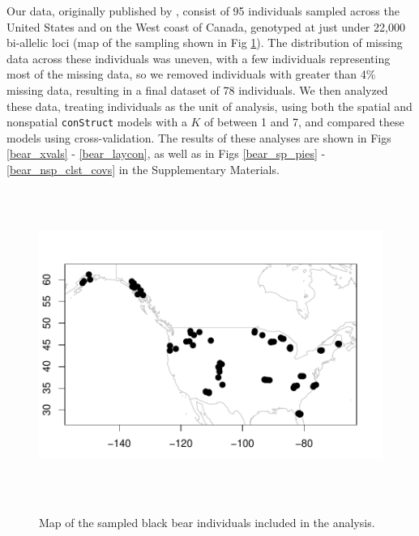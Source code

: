 \documentclass[12pt]{article}
\begin{document}
Our data, originally published by \cite{Puckett2015}, consist of 95 individuals 
sampled across the United States and on the West coast of Canada,
genotyped at just under 22,000 bi-allelic loci (map of the sampling shown in Fig \ref{bear_map}).
The distribution of missing data across these individuals was uneven, 
with a few individuals representing most of the missing data, 
so we removed individuals with greater than 4\% missing data, 
resulting in a final dataset of 78 individuals.
We then analyzed these data, treating individuals as the unit of analysis, 
using both the spatial and nonspatial \texttt{conStruct} models with a $K$ of between 1 and 7, 
and compared these models using cross-validation.
The results of these analyses are shown in Figs \ref{bear_xvals} - \ref{bear_laycon}, 
as well as in Figs \ref{bear_sp_pies} - \ref{bear_nsp_clst_covs} in the Supplementary Materials.

\begin{figure}
	\centering
		{\includegraphics[width=6in,height=4in]{figs/bears/bear_sampling_map.pdf}}
	\caption{
	Map of the sampled black bear individuals included in the analysis.
    }\label{bear_map}
\end{figure}
\end{document}
